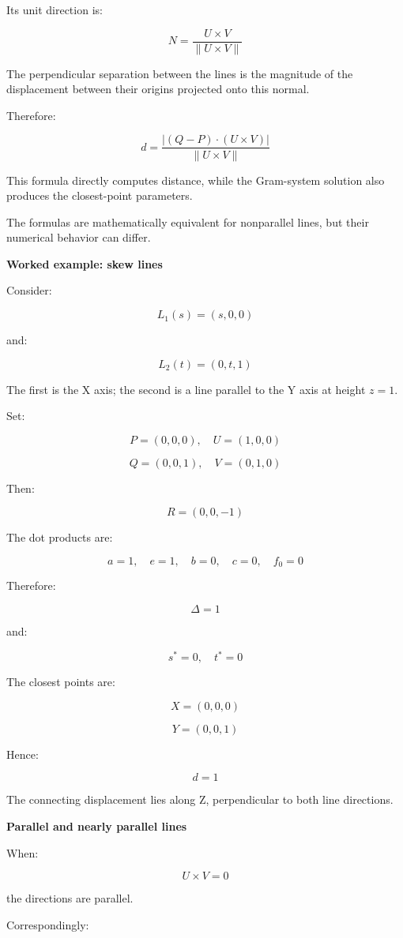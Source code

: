 Its unit direction is:

\[
N=\frac{U\times V}{\|U\times V\|}
\]

The perpendicular separation between the lines is the magnitude of the displacement between their origins projected onto this normal.

Therefore:

\[
\boxed{ d= \frac{|(Q-P)\cdot(U\times V)|} {\|U\times V\|} }
\]

This formula directly computes distance, while the Gram-system solution also produces the closest-point parameters.

The formulas are mathematically equivalent for nonparallel lines, but their numerical behavior can differ.

\textbf{Worked example: skew lines}

Consider:

\[
L_1(s)=(s,0,0)
\]

and:

\[
L_2(t)=(0,t,1)
\]

The first is the X axis; the second is a line parallel to the Y axis at height \(z=1\).

Set:

\[
P=(0,0,0),\quad U=(1,0,0)
\]

\[
Q=(0,0,1),\quad V=(0,1,0)
\]

Then:

\[
R=(0,0,-1)
\]

The dot products are:

\[
a=1,\quad e=1,\quad b=0,\quad c=0,\quad f_0=0
\]

Therefore:

\[
\Delta=1
\]

and:

\[
s^*=0,\quad t^*=0
\]

The closest points are:

\[
X=(0,0,0)
\]

\[
Y=(0,0,1)
\]

Hence:

\[
\boxed{d=1}
\]

The connecting displacement lies along Z, perpendicular to both line directions.

\textbf{Parallel and nearly parallel lines}

When:

\[
U\times V=0
\]

the directions are parallel.

Correspondingly:

